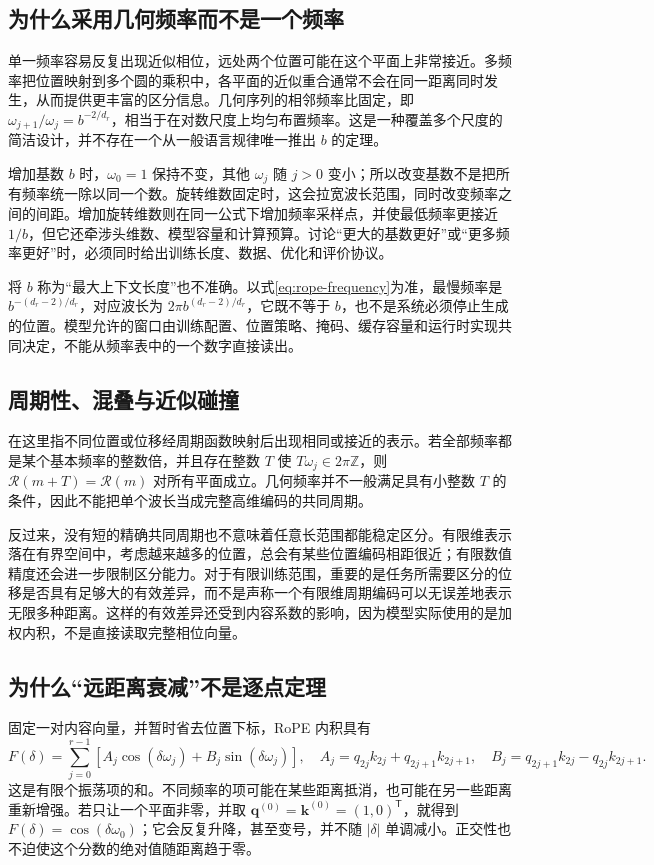 \documentclass[UTF8,12pt,a4paper,fontset=fandol]{ctexart}
\begin{document}
\subsection{为什么采用几何频率而不是一个频率}
单一频率容易反复出现近似相位，远处两个位置可能在这个平面上非常接近。多频率把位置映射到多个圆的乘积中，各平面的近似重合通常不会在同一距离同时发生，从而提供更丰富的区分信息。几何序列的相邻频率比固定，即 $\omega_{j+1}/\omega_j=b^{-2/d_r}$，相当于在对数尺度上均匀布置频率。这是一种覆盖多个尺度的简洁设计，并不存在一个从一般语言规律唯一推出 $b$ 的定理。

增加基数 $b$ 时，$\omega_0=1$ 保持不变，其他 $\omega_j$ 随 $j>0$ 变小；所以改变基数不是把所有频率统一除以同一个数。旋转维数固定时，这会拉宽波长范围，同时改变频率之间的间距。增加旋转维数则在同一公式下增加频率采样点，并使最低频率更接近 $1/b$，但它还牵涉头维数、模型容量和计算预算。讨论“更大的基数更好”或“更多频率更好”时，必须同时给出训练长度、数据、优化和评价协议。

将 $b$ 称为“最大上下文长度”也不准确。以式\eqref{eq:rope-frequency}为准，最慢频率是 $b^{-(d_r-2)/d_r}$，对应波长为 $2\pi b^{(d_r-2)/d_r}$，它既不等于 $b$，也不是系统必须停止生成的位置。模型允许的窗口由训练配置、位置策略、掩码、缓存容量和运行时实现共同决定，不能从频率表中的一个数字直接读出。

\subsection{周期性、混叠与近似碰撞}
在这里指不同位置或位移经周期函数映射后出现相同或接近的表示。若全部频率都是某个基本频率的整数倍，并且存在整数 $T$ 使 $T\omega_j\in2\pi\mathbb Z$，则 $\mathcal R(m+T)=\mathcal R(m)$ 对所有平面成立。几何频率并不一般满足具有小整数 $T$ 的条件，因此不能把单个波长当成完整高维编码的共同周期。

反过来，没有短的精确共同周期也不意味着任意长范围都能稳定区分。有限维表示落在有界空间中，考虑越来越多的位置，总会有某些位置编码相距很近；有限数值精度还会进一步限制区分能力。对于有限训练范围，重要的是任务所需要区分的位移是否具有足够大的有效差异，而不是声称一个有限维周期编码可以无误差地表示无限多种距离。这样的有效差异还受到内容系数的影响，因为模型实际使用的是加权内积，不是直接读取完整相位向量。

\subsection{为什么“远距离衰减”不是逐点定理}
固定一对内容向量，并暂时省去位置下标，RoPE 内积具有
\begin{equation}
F(\delta)=\sum_{j=0}^{r-1}
\left[A_j\cos(\delta\omega_j)+B_j\sin(\delta\omega_j)\right],
\quad
A_j=q_{2j}k_{2j}+q_{2j+1}k_{2j+1},\quad
B_j=q_{2j+1}k_{2j}-q_{2j}k_{2j+1}.
\label{eq:rope-fourier}
\end{equation}
这是有限个振荡项的和。不同频率的项可能在某些距离抵消，也可能在另一些距离重新增强。若只让一个平面非零，并取 $\mathbf q^{(0)}=\mathbf k^{(0)}=(1,0)^{\mathsf T}$，就得到 $F(\delta)=\cos(\delta\omega_0)$；它会反复升降，甚至变号，并不随 $|\delta|$ 单调减小。正交性也不迫使这个分数的绝对值随距离趋于零。
\end{document}
